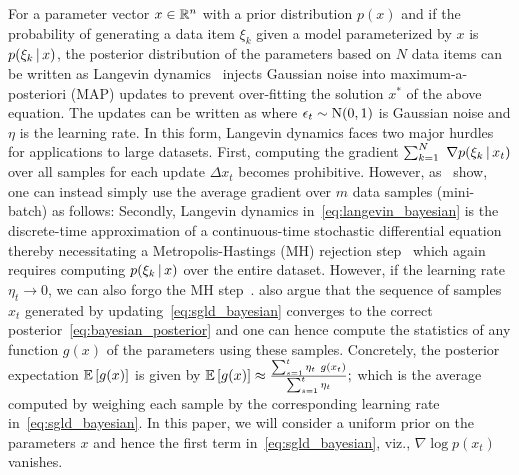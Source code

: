\documentclass[10pt]{article}
\begin{document}
\begin{appendices}
For a parameter vector $x \in \mathbb{R}^n$ with a prior distribution $p(x)$ and if the probability of generating a data item $\xi_k$ given a model parameterized by $x$ is $p(\xi_k \, \vert \, x)$, the posterior distribution of the parameters based on $N$ data items can be written as
Langevin dynamics~\citep{neal2011mcmc} injects Gaussian noise into maximum-a-posteriori (MAP) updates to prevent over-fitting the solution $x^*$ of the above equation. The updates can be written as
where $\epsilon_t \sim \mathrm{N}(0, 1)$ is Gaussian noise and $\eta$ is the learning rate. In this form, Langevin dynamics faces two major hurdles for applications to large datasets. First, computing the gradient $\sum_{k=1}^N\ \nabla p(\xi_k \, \vert \, x_t)$ over all samples for each update $\Delta x_t$ becomes prohibitive. However, as~\citet{welling2011bayesian} show, one can instead simply use the average gradient over $m$ data samples (mini-batch) as follows:
Secondly, Langevin dynamics in~\eqref{eq:langevin_bayesian} is the discrete-time approximation of a continuous-time stochastic differential equation~\citep{mandt2016variational} thereby necessitating a Metropolis-Hastings (MH) rejection step~\citep{roberts2002langevin} which again requires computing $p(\xi_k \, \vert \, x)$ over the entire dataset. However, if the learning rate $\eta_t \to 0$, we can also forgo the MH step~\citep{chen2014stochastic}. \citet{welling2011bayesian} also argue that the sequence of samples $x_t$ generated by updating~\eqref{eq:sgld_bayesian} converges to the correct posterior~\eqref{eq:bayesian_posterior} and one can hence compute the statistics of any function $g(x)$ of the parameters using these samples. Concretely, the posterior expectation $\mathbb{E}\left[g(x)\right]$ is given by
$
    \mathbb{E}\left[g(x)\right] \approx \frac{\sum_{s=1}^t \eta_t\ g(x_t)}{\sum_{s=1}^t \eta_t};
$
which is the average computed by weighing each sample by the corresponding learning rate in~\eqref{eq:sgld_bayesian}. In this paper, we will consider a uniform prior on the parameters $x$ and hence the first term in~\eqref{eq:sgld_bayesian}, viz., $\nabla \log p(x_t)$ vanishes.


\end{appendices}
\end{document}
